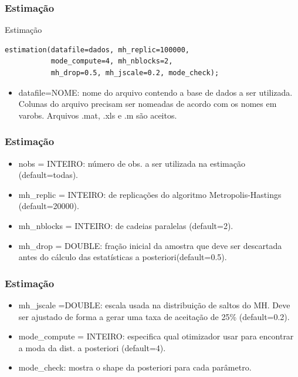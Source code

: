 \documentclass[xcolor=pdftex,dvipsnames,table]{beamer}
\newcommand{\ft}{\frametitle}
\begin{document}

\begin{frame}[fragile]
\ft{Estimação}

\begin{block}{Estimação}
\begin{lstlisting}
estimation(datafile=dados, mh_replic=100000, 
		   mode_compute=4, mh_nblocks=2, 
		   mh_drop=0.5, mh_jscale=0.2, mode_check);
\end{lstlisting}
\end{block}

\begin{itemize}
\item datafile=NOME: nome do arquivo contendo a base de dados a
ser utilizada. Colunas do arquivo precisam ser nomeadas de acordo
com os nomes em varobs. Arquivos .mat, .xls e .m são aceitos.

\end{itemize}

\end{frame}


\begin{frame}[fragile]
\ft{Estimação}

\begin{itemize}

\item nobs = INTEIRO: número de obs. a ser utilizada na estimação (default=todas).

\item mh\_replic = INTEIRO: de replicações do algoritmo Metropolis-Hastings (default=20000).


\item mh\_nblocks = INTEIRO: de cadeias paralelas (default=2).


\item mh\_drop = DOUBLE: fração inicial da amostra que deve ser descartada antes do cálculo das estatísticas a posteriori(default=0.5).


\end{itemize}
\end{frame}



\begin{frame}
\ft{Estimação}

\begin{itemize}

\item mh\_jscale =DOUBLE: escala usada na distribuição de saltos do MH. Deve ser ajustado de forma a gerar uma taxa de aceitação de 25\% (default=0.2).

\item mode\_compute = INTEIRO: especifica qual otimizador usar para encontrar
a moda da dist. a posteriori (default=4).

\item mode\_check: mostra o shape da posteriori para cada parâmetro.
\end{itemize}
\end{frame}

\begin{frame}
\begin{scriptsize}

\end{scriptsize}
\end{frame}
\end{document}

